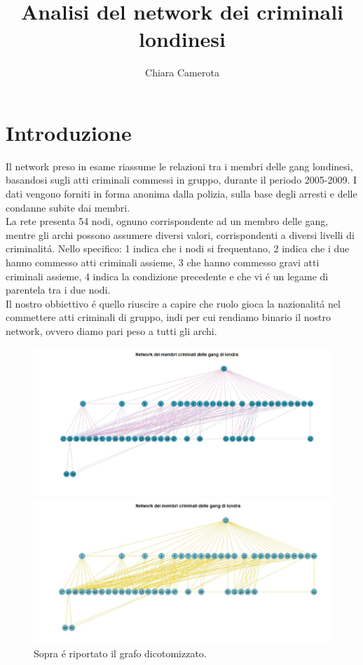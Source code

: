 \documentclass[11pt,a4paper]{report}
\author{Chiara Camerota}
\title{Analisi del network dei criminali londinesi}
\begin{document}
	\maketitle
\chapter*{Introduzione}
Il network preso in esame riassume le relazioni tra i membri delle gang londinesi, basandosi sugli atti criminali commessi in gruppo, durante il periodo 2005-2009. I dati vengono forniti in forma anonima dalla polizia, sulla base degli arresti e delle condanne subite dai membri. 
 \\
La rete presenta 54 nodi, ognuno corrispondente ad un membro delle gang, mentre gli archi possono assumere diversi valori, corrispondenti a diversi livelli di criminalit\'a. Nello specifico: 1 indica che i nodi si frequentano, 2 indica che i due hanno commesso atti criminali assieme, 3 che hanno commesso gravi atti criminali assieme, 4 indica la condizione precedente e che vi \'e un legame di parentela tra i due nodi.
\\
Il nostro obbiettivo \'e quello riuscire a capire che ruolo gioca la nazionalit\'a nel commettere atti criminali di gruppo, indi per cui rendiamo binario il nostro network, ovvero diamo pari peso a tutti gli archi.
\\
\begin{figure}[H]
	\centering
		\includegraphics[scale =0.5]{networkviola}
	\caption{Sopra \'e riportato il grafo originale, ogni colore indica un legame diverso tra le unit\'a. Il rosa indica un arco di tipo 1, il blu cobalto chiaro un legame di tipo 2, il marrone uno di tipo 3, il blu cobalto scuro un legame di tipo 4 .Come si pu\'o osservare, il grafo presenta una struttura piramidale, tipica delle organizzazioni criminali.}
	\includegraphics[scale =0.5]{networkbinary}
	\caption{Sopra \'e riportato il grafo dicotomizzato.}

\end{figure}
\end{document}
